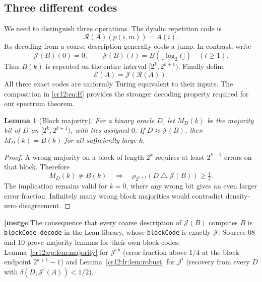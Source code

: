 \documentclass[11pt,letterpaper]{article}
\theoremstyle{plain}
\newtheorem{lemma}[theorem]{Lemma}
\theoremstyle{definition}
\theoremstyle{remark}
\numberwithin{equation}{section}
\newcommand{\Rcode}{\mathcal R}
\newcommand{\Ecode}{\mathcal E}
\newcommand{\Jcode}{\mathcal J}
\newcommand{\sd}{\mathbin{\triangle}}
\newcommand{\mergenote}[1]{\par\smallskip\noindent
 {\small\textsf{\textbf{[merge]}}\enspace #1}\par\smallskip}
\newcommand{\Jsh}{\mathcal J^{\mathrm{sh}}} %
\newcommand{\Jfac}{\mathcal J^{!}}       %
\begin{document}
\subsection{Three different codes}
We need to distinguish three operations. The dyadic repetition code is
\begin{equation}\label{cr12:eq:R}
 \Rcode(A)(p(i,m))=A(i).
\end{equation}
Its decoding from a coarse description generally costs a jump. In contrast,
write
\begin{equation}\label{cr12:eq:J}
 \Jcode(B)(0)=0,\qquad
 \Jcode(B)(t)=B(\lfloor\log_2 t\rfloor)\quad(t\ge1).
\end{equation}
Thus $B(k)$ is repeated on the entire interval $[2^k,2^{k+1})$.
Finally define
\begin{equation}\label{cr12:eq:E}
 \Ecode(A)=\Jcode(\Rcode(A)).
\end{equation}
All three exact codes are uniformly Turing equivalent to their inputs. The
composition in \eqref{cr12:eq:E} provides the stronger decoding property required
for our spectrum theorem.

\begin{lemma}[Block majority]\label{cr12:lem:majority}
For a binary oracle $D$, let $M_D(k)$ be the majority bit of $D$ on
$[2^k,2^{k+1})$, with ties assigned $0$. If $D\approx\Jcode(B)$, then
$M_D(k)=B(k)$ for all sufficiently large $k$.
\end{lemma}
\begin{proof}
A wrong majority on a block of length $2^k$ requires at least $2^{k-1}$ errors
on that block. Therefore
\[
 M_D(k)\ne B(k)\quad\Longrightarrow\quad
 \rho_{2^{k+1}}(D\sd\Jcode(B))\ge\tfrac14.
\]
The implication remains valid for $k=0$, where any wrong bit gives an even
larger error fraction. Infinitely many wrong block majorities would contradict
density-zero disagreement.
\end{proof}
\mergenote{The consequence that every coarse description of $\Jcode(B)$ computes $B$ is
\texttt{blockCode\_decode} in the Lean library, whose \texttt{blockCode} is exactly
$\Jcode$. Sources 08 and 10 prove majority lemmas for their own block codes:
Lemma~\ref{cr12:ep:lem:majority} for $\Jsh$ (error fraction above $1/4$ at the block
endpoint $2^{k+1}-1$) and Lemma~\ref{cr12:lr:lem:robust} for $\Jfac$ (recovery from
every $D$ with $\delta(D,\Jfac(A))<1/2$).}
\end{document}
